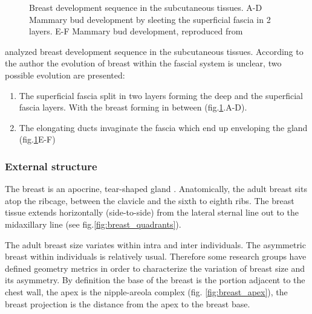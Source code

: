 \begin{center}
\begin{figure}[!h]
\caption[Breast development sequence in the subcutaneous tissues. A-D Mammary bud development by spleeting the superficial fascia in 2 layers. E-F Mammary bud development]{Breast development sequence in the subcutaneous tissues. A-D Mammary bud development by sleeting the superficial fascia in 2 layers. E-F Mammary bud development, reproduced from  ~~\cite{kopans_daniel_b_breast_2007}  }
\label{breastevol_fascia}
\end{figure}
\end{center}

\cite{kopans_daniel_b_breast_2007} analyzed breast development sequence in the subcutaneous tissues. According to the author the evolution of breast within the fascial system is unclear, two possible evolution are presented: 
\begin{enumerate}
\item The superficial fascia split in two layers forming the deep and the superficial fascia layers. With the breast forming in between (fig.\ref{breastevol_fascia}.A-D).
\item The elongating ducts invaginate the fascia which end up 
enveloping the gland (fig.\ref{breastevol_fascia}E-F)
\end{enumerate}


\subsubsection*{External structure}
The breast is an apocrine, tear-shaped gland \cite{valerie_mammographic_2011}. Anatomically, the adult breast sits atop the ribcage, between the clavicle and the sixth to eighth ribs. The breast tissue extends horizontally (side-to-side) from the lateral sternal line out to the midaxillary line (see fig.\ref{fig:breast_quadrants}).

The adult breast size variates within intra and inter individuals. The asymmetric breast within individuals is relatively usual. Therefore some research groups have defined geometry metrics in order to characterize the variation of breast size  and its asymmetry. By definition the base of the breast is the portion adjacent to the chest wall, the apex is the nipple-areola complex (fig. \ref{fig:breast_apex}), the breast projection is the distance from the apex to the breast base. 


